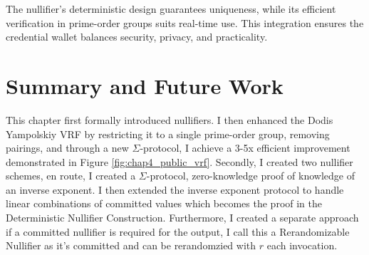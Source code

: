 The nullifier’s deterministic design guarantees uniqueness, while its efficient verification in prime-order groups suits real-time use. This integration ensures the credential wallet balances security, privacy, and practicality.


\section{Summary and Future Work}

This chapter first formally introduced nullifiers. I then enhanced the Dodis Yampolskiy VRF by restricting it to a single prime-order group, removing pairings, and through a new $\Sigma$-protocol, I achieve a 3-5x efficient improvement demonstrated in Figure \ref{fig:chap4_public_vrf}. Secondly, I created two nullifier schemes, en route, I created a $\Sigma$-protocol, zero-knowledge proof of knowledge of an inverse exponent. I then extended the inverse exponent protocol to handle linear combinations of committed values which becomes the proof in the Deterministic Nullifier Construction. Furthermore, I created a separate approach if a committed nullifier is required for the output, I call this a Rerandomizable Nullifier as it's committed and can be rerandomzied with $r$ each invocation. 

